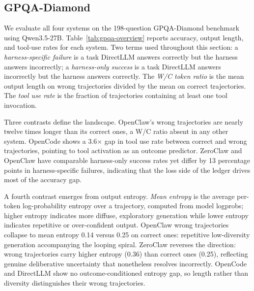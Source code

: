 
\newcommand{\findingbox}[1]{%
  \refstepcounter{finding}%
  \begin{tcolorbox}[
    colback=blue!6!white,
    colframe=blue!45!black,
    boxrule=0.5pt,
    arc=3pt,
    left=8pt, right=8pt, top=6pt, bottom=6pt,
  ]
  \textbf{Finding \thefinding.}\enspace #1
  \end{tcolorbox}
}


\subsection{GPQA-Diamond}
\label{appendix:macro-gpqa}

We evaluate all four systems on the 198-question GPQA-Diamond benchmark using
Qwen3.5-27B.
Table~\ref{tab:gpqa-overview} reports accuracy, output length, and tool-use rates
for each system.
Two terms used throughout this section: a \emph{harness-specific failure} is a
task DirectLLM answers correctly but the harness answers incorrectly; a
\emph{harness-only success} is a task DirectLLM answers incorrectly but the
harness answers correctly.
The \emph{W/C token ratio} is the mean output length on wrong trajectories
divided by the mean on correct trajectories.
The \emph{tool use rate} is the fraction of trajectories containing at least one
tool invocation.

Three contrasts define the landscape.
OpenClaw's wrong trajectories are nearly twelve times longer than its correct
ones, a W/C ratio absent in any other system.
OpenCode shows a 3.6$\times$ gap in tool use rate between correct and wrong
trajectories, pointing to tool activation as an outcome predictor.
ZeroClaw and OpenClaw have comparable harness-only success rates yet differ
by 13 percentage points in harness-specific failures, indicating that the loss
side of the ledger drives most of the accuracy gap.

A fourth contrast emerges from output entropy.
\emph{Mean entropy} is the average per-token log-probability entropy over a
trajectory, computed from model logprobs; higher entropy indicates more
diffuse, exploratory generation while lower entropy indicates repetitive or
over-confident output.
OpenClaw wrong trajectories collapse to mean entropy 0.14 versus 0.25 on
correct ones: repetitive low-diversity generation accompanying the looping
spiral.
ZeroClaw reverses the direction: wrong trajectories carry higher entropy (0.36)
than correct ones (0.25), reflecting genuine deliberative uncertainty that
nonetheless resolves incorrectly.
OpenCode and DirectLLM show no outcome-conditioned entropy gap, so length
rather than diversity distinguishes their wrong trajectories.

